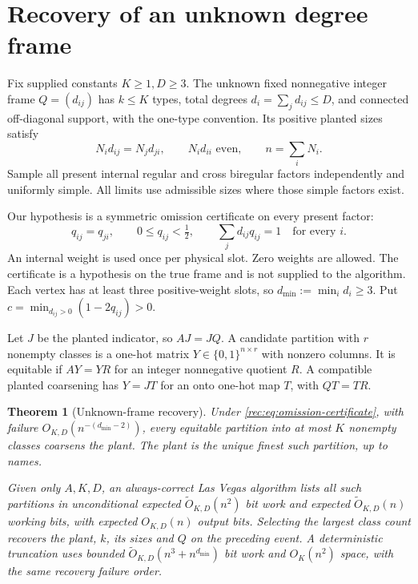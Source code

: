 \documentclass[11pt]{article}
\newtheorem{theorem}{Theorem}[section]
\theoremstyle{definition}
\theoremstyle{remark}
\newcommand{\1}{\mathbf 1}
\begin{document}
\clearpage
\section{Recovery of an unknown degree frame}\label{rec:sec:unknown-frame}
Fix supplied constants $K\ge1,D\ge3$. The unknown fixed nonnegative
integer frame $Q=(d_{ij})$ has $k\le K$ types, total degrees
$d_i=\sum_jd_{ij}\le D$, and connected off-diagonal support, with the
one-type convention. Its positive planted sizes satisfy
\begin{equation}\label{rec:eq:unknown-balance}
 N_id_{ij}=N_jd_{ji},\qquad N_id_{ii}\text{ even},\qquad n=\sum_iN_i.
\end{equation}
Sample all present internal regular and cross biregular factors
independently and uniformly simple. All limits use admissible sizes
where those simple factors exist.

Our hypothesis is a symmetric omission certificate on every present
factor:
\begin{equation}\label{rec:eq:omission-certificate}
 q_{ij}=q_{ji},\qquad 0\le q_{ij}<\tfrac12,\qquad
 \sum_jd_{ij}q_{ij}=1\quad\text{for every }i.
\end{equation}
An internal weight is used once per physical slot. Zero weights are
allowed. The certificate is a hypothesis on the true frame and is
not supplied to the algorithm. Each vertex has at least three
positive-weight slots, so $d_{\min}:=\min_i d_i\ge3$.
Put $c=\min_{d_{ij}>0}(1-2q_{ij})>0$.

Let $J$ be the planted indicator, so $AJ=JQ$. A candidate partition
with $r$ nonempty classes is a one-hot matrix
$Y\in\{0,1\}^{n\times r}$ with nonzero columns. It is equitable if
$AY=YR$ for an integer nonnegative quotient $R$.
A compatible planted coarsening has $Y=JT$ for an onto one-hot map
$T$, with $QT=TR$.

\begin{theorem}[Unknown-frame recovery]\label{rec:thm:unknown-frame}
Under \eqref{rec:eq:omission-certificate}, with failure
$O_{K,D}(n^{-(d_{\min}-2)})$, every equitable partition into at most
$K$ nonempty classes coarsens the plant. The plant is the unique
finest such partition, up to names.

Given only $A,K,D$, an always-correct Las Vegas algorithm lists all
such partitions in unconditional expected $\widetilde O_{K,D}(n^2)$
bit work and expected $\widetilde O_{K,D}(n)$ working bits, with
expected $O_{K,D}(n)$ output bits. Selecting the largest class count
recovers the plant, $k$, its sizes and $Q$ on the preceding event.
A deterministic truncation uses bounded
$\widetilde O_{K,D}(n^3+n^{d_{\min}})$ bit work and $O_K(n^2)$ space,
with the same recovery failure order.
\end{theorem}
\end{document}
